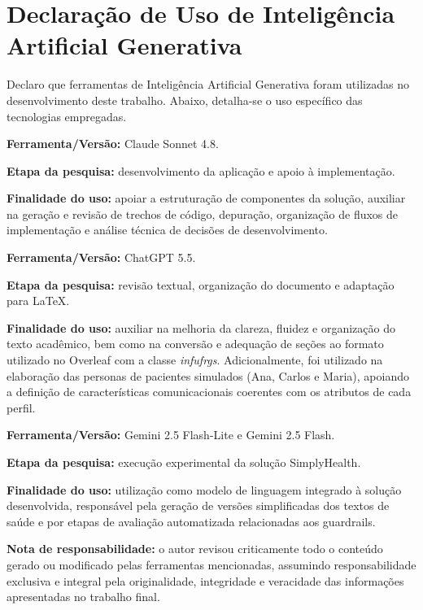 \chapter*{Declaração de Uso de Inteligência Artificial Generativa}

Declaro que ferramentas de Inteligência Artificial Generativa foram utilizadas no desenvolvimento deste trabalho. Abaixo, detalha-se o uso específico das tecnologias empregadas.

\vspace{1em}

\noindent\textbf{Ferramenta/Versão:} Claude Sonnet 4.8.

\noindent\textbf{Etapa da pesquisa:} desenvolvimento da aplicação e apoio à implementação.

\noindent\textbf{Finalidade do uso:} apoiar a estruturação de componentes da solução, auxiliar na geração e revisão de trechos de código, depuração, organização de fluxos de implementação e análise técnica de decisões de desenvolvimento.

\vspace{0.8em}

\noindent\textbf{Ferramenta/Versão:} ChatGPT 5.5.

\noindent\textbf{Etapa da pesquisa:} revisão textual, organização do documento e adaptação para \LaTeX{}.

\noindent\textbf{Finalidade do uso:} auxiliar na melhoria da clareza, fluidez e organização do texto acadêmico, bem como na conversão e adequação de seções ao formato utilizado no Overleaf com a classe \textit{infufrgs}. Adicionalmente, foi utilizado na elaboração das personas de pacientes simulados (Ana, Carlos e Maria), apoiando a definição de características comunicacionais coerentes com os atributos de cada perfil.

\vspace{0.8em}

\noindent\textbf{Ferramenta/Versão:} Gemini 2.5 Flash-Lite e Gemini 2.5 Flash. 

\noindent\textbf{Etapa da pesquisa:} execução experimental da solução SimplyHealth. 

\noindent\textbf{Finalidade do uso:} utilização como modelo de linguagem integrado à solução desenvolvida, responsável pela geração de versões simplificadas dos textos de saúde e por etapas de avaliação automatizada relacionadas aos guardrails.
\vspace{0.8em}

\noindent\textbf{Nota de responsabilidade:} o autor revisou criticamente todo o conteúdo gerado ou modificado pelas ferramentas mencionadas, assumindo responsabilidade exclusiva e integral pela originalidade, integridade e veracidade das informações apresentadas no trabalho final.
